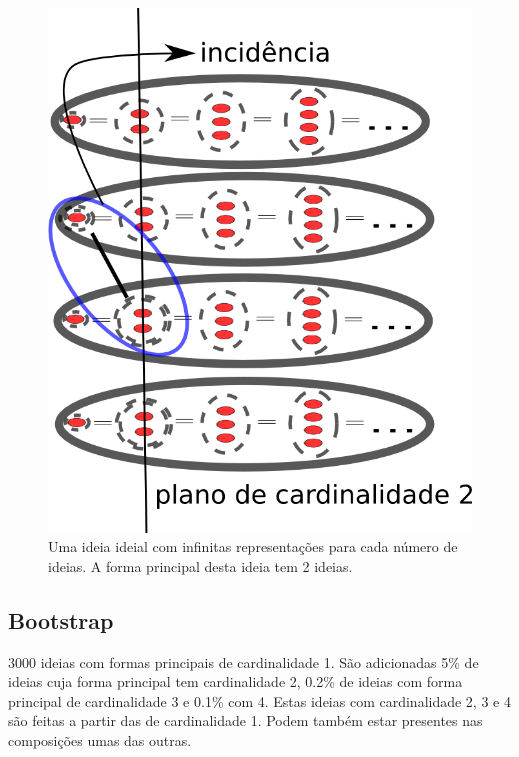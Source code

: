\documentclass[a4paper,12pt,titlepage]{article}
\begin{document}
\begin{figure}[h!]
    \begin{center}
        \includegraphics[scale=.3]{figs/planoIdeias}
        \caption{Uma ideia ideial com infinitas representações para cada número de ideias. A forma
        principal desta ideia tem 2 ideias.}
        \label{fig:face}
    \end{center}
\end{figure}






\subsection{Bootstrap}
3000 ideias com formas principais de cardinalidade 1. São adicionadas 5\% de ideias
cuja forma principal tem cardinalidade 2, 0.2\% de ideias com forma principal de cardinalidade 3 e 0.1\% com 4.
Estas ideias com cardinalidade 2, 3 e 4 são feitas a partir das de cardinalidade 1. Podem também
estar presentes nas composições umas das outras.
\end{document}
